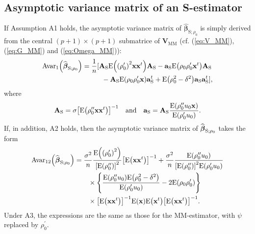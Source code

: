 \subsection{Asymptotic variance matrix of an S-estimator}

If Assumption A1 holds, the asymptotic variance matrix of $\widehat
{\boldsymbol\beta}_{\mathrm{S};\rho_{0}}$ is simply derived from the central
$(p+1)\times(p+1)$ submatrice of $\mathbf{V}_{\mathrm{MM}}$ (cf.
(\ref{eq:V_MM}), (\ref{eq:G_MM}) and (\ref{eq:Omega_MM})):
\begin{align*}
\mathrm{Avar}_{1}\left(  \sthat{\boldsymbol\beta}_{\mathrm{S};\rho_{0}%
}\right)   &  =\frac{1}{n}[\mathbf{A}_{\mathrm{S}}\mathrm{E}\left(  \left(
\rho_{0}^{\prime}\right)  ^{2}\mathbf{xx}^{t}\right)  \mathbf{A}_{\mathrm{S}%
}-\mathbf{a}_{\mathrm{S}}\mathrm{E}\left(  \rho_{0}\rho_{0}^{\prime}%
\stvec{x}^{t}\right)  \mathbf{A}_{\mathrm{S}}\\
&  \hspace{1cm}-\mathbf{A}_{\mathrm{S}}\mathrm{E}\left(  \rho_{0}\rho
_{0}^{\prime}\stvec{x}\right)  \mathbf{a}_{\mathrm{S}}^{t}+\mathrm{E}\left(
\rho_{0}^{2}-\delta^{2}\right)  \mathbf{a}_{\mathrm{S}}\mathbf{a}_{\mathrm{S}%
}^{t}],
\end{align*}
where
\[
\mathbf{A}_{\mathrm{S}}=\sigma\left[  \mathrm{E}\left(  \rho_{0}^{\prime
\prime}\mathbf{xx}^{t}\right)  \right]  ^{-1}\quad\text{and\quad}%
\mathbf{a}_{\mathrm{S}}=\mathbf{A}_{\mathrm{S}}\frac{\mathrm{E}\left(
\rho_{0}^{\prime\prime}u_{0}\stvec{x}\right)  }{\mathrm{E}\left(  \rho
_{0}^{\prime}u_{0}\right)  }.
\]
If, in addition, A2 holds, then the asymptotic variance matrix of
$\widehat{\boldsymbol\beta}_{\mathrm{S};\rho_{0}}$ takes the form
\begin{align*}
\mathrm{Avar}_{12}\left(  \sthat{\boldsymbol\beta}_{\mathrm{S};\rho_{0}%
}\right)   &  =\frac{\sigma^{2}}{n}\frac{\mathrm{E}\left(  \left(  \rho
_{0}^{\prime}\right)  ^{2}\right)  }{\left[  \mathrm{E}\left(  \rho
_{0}^{\prime\prime}\right)  \right]  ^{2}}\left[  \mathrm{E}\left(
\mathbf{xx}^{t}\right)  \right]  ^{-1}+\frac{\sigma^{2}}{n}\frac
{\mathrm{E}\left(  \rho_{0}^{\prime\prime}u_{0}\right)  }{\left[
\mathrm{E}\left(  \rho_{0}^{\prime\prime}\right)  \right]  ^{2}\mathrm{E}%
\left(  \rho_{0}^{\prime}u_{0}\right)  }\\
&  \qquad\times\left\{  \frac{\mathrm{E}\left(  \rho_{0}^{\prime\prime}%
u_{0}\right)  \mathrm{E}\left(  \rho_{0}^{2}-\delta^{2}\right)  }%
{\mathrm{E}\left(  \rho_{0}^{\prime}u_{0}\right)  }-2\mathrm{E}\left(
\rho_{0}\rho_{0}^{\prime}\right)  \right\} \\
&  \qquad\times\left[  \mathrm{E}\left(  \mathbf{xx}^{t}\right)  \right]
^{-1}\mathrm{E}\left(  \stvec{x}\right)  \mathrm{E}\left(  \stvec{x}%
^{t}\right)  \left[  \mathrm{E}\left(  \mathbf{xx}^{t}\right)  \right]  ^{-1}.
\end{align*}
Under A3, the expressions are the same as those for the MM-estimator, with
$\psi$ replaced by $\rho_{0}^{\prime}$.

